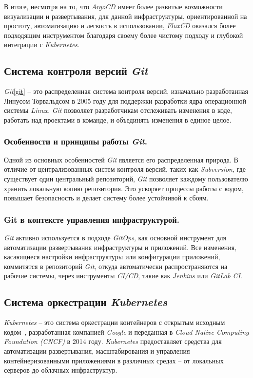 В итоге, несмотря на то, что \textit{ArgoCD} имеет более развитые возможности визуализации и развертывания, для данной инфраструктуры, ориентированной на простоту, автоматизацию и легкость в использовании, \textit{FluxCD} оказался более подходящим инструментом благодаря своему более чистому подходу и глубокой интеграции с \textit{Kubernetes}.

\subsection{Система контроля версий \textit{Git}}
\label{sec:git}
\textit{Git}\ref{git} -- это распределенная система контроля версий, изначально разработанная Линусом Торвальдсом в 2005 году для поддержки разработки ядра операционной системы \textit{Linux}. \textit{Git} позволяет разработчикам отслеживать изменения в коде, работать над проектами в команде, и объединять изменения в единое целое.

\subsubsection{Особенности и принципы работы \textit{Git}.}
Одной из основных особенностей \textit{Git} является его распределенная природа. В отличие от централизованных систем контроля версий, таких как \textit{Subversion}, где существует один центральный репозиторий, \textit{Git} позволяет каждому пользователю хранить локальную копию репозитория. Это ускоряет процессы работы с кодом, повышает безопасность и делает систему более устойчивой к сбоям.

\subsubsection{Git в контексте управления инфраструктурой.}
\textit{Git} активно используется в подходе \textit{GitOps}, как основной инструмент для автоматизации развертывания инфраструктуры и приложений. Все изменения, касающиеся настройки инфраструктуры или конфигурации приложений, коммитятся в репозиторий \textit{Git}, откуда автоматически распространяются на рабочие системы, через инструменты \textit{CI/CD}, такие как \textit{Jenkins} или \textit{GitLab CI}.

\subsection{Система оркестрации \textit{Kubernetes}}
\label{sec:kubernetes}
\textit{Kubernetes} -- это система оркестрации контейнеров с открытым исходным кодом~\cite{kubernetes}, разработанная компанией \textit{Google} и переданная в \textit{Cloud Native Computing Foundation (CNCF)} в 2014 году. \textit{Kubernetes} предоставляет средства для автоматизации развертывания, масштабирования и управления контейнеризованными приложениями в различных средах -- от локальных серверов до облачных инфраструктур.

